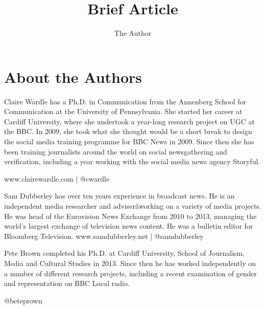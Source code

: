 \documentclass[12pt]{article}
\title{Brief Article}
\author{The Author}
\begin{document}
\maketitle






\chapter{About the Authors}
Claire Wardle has a Ph.D. in Communication from the Annenberg School
for Communication at the University of Pennsylvania. She started her career
at Cardiff University, where she undertook a year-long research project on
UGC at the BBC. In 2009, she took what she thought would be a short break
to design the social media training programme for BBC News in 2009. Since
then she has been training journalists around the world on social newsgathering
and verification, including a year working with the social media news
agency Storyful.

www.clairewardle.com | @cwardle

Sam Dubberley has over ten years experience in broadcast news. He is an
independent media researcher and adviserâworking on a variety of media
projects. He was head of the Eurovision News Exchange from 2010 to 2013,
managing the world's largest exchange of television news content. He was a
bulletin editor for Bloomberg Television.
www.samdubberley.net | @samdubberley

Pete Brown completed his Ph.D. at Cardiff University, School of Journalism,
Media and Cultural Studies in 2013. Since then he has worked independently
on a number of different research projects, including a recent
examination of gender and representation on BBC Local radio.

@beteprown
\end{document}
